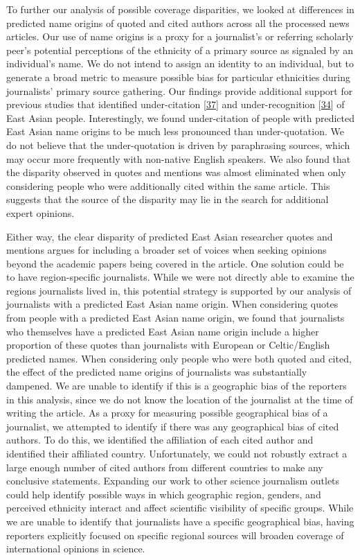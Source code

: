 To further our analysis of possible coverage disparities, we looked at differences in predicted name origins of quoted and cited authors across all the processed news articles.
Our use of name origins is a proxy for a journalist's or referring scholarly peer's potential perceptions of the ethnicity of a primary source as signaled by an individual's name.
We do not intend to assign an identity to an individual, but to generate a broad metric to measure possible bias for particular ethnicities during journalists' primary source gathering.
Our findings provide additional support for previous studies that identified under-citation {[}\protect\hyperlink{ref-MpfuFcH2}{37}{]} and under-recognition {[}\protect\hyperlink{ref-GCXcas65}{34}{]} of East Asian people.
Interestingly, we found under-citation of people with predicted East Asian name origins to be much less pronounced than under-quotation.
We do not believe that the under-quotation is driven by paraphrasing sources, which may occur more frequently with non-native English speakers.
We also found that the disparity observed in quotes and mentions was almost eliminated when only considering people who were additionally cited within the same article.
This suggests that the source of the disparity may lie in the search for additional expert opinions.

Either way, the clear disparity of predicted East Asian researcher quotes and mentions argues for including a broader set of voices when seeking opinions beyond the academic papers being covered in the article.
One solution could be to have region-specific journalists.
While we were not directly able to examine the regions journalists lived in, this potential strategy is supported by our analysis of journalists with a predicted East Asian name origin.
When considering quotes from people with a predicted East Asian name origin, we found that journalists who themselves have a predicted East Asian name origin include a higher proportion of these quotes than journalists with European or Celtic/English predicted names.
When considering only people who were both quoted and cited, the effect of the predicted name origins of journalists was substantially dampened.
We are unable to identify if this is a geographic bias of the reporters in this analysis, since we do not know the location of the journalist at the time of writing the article.
As a proxy for measuring possible geographical bias of a journalist, we attempted to identify if there was any geographical bias of cited authors.
To do this, we identified the affiliation of each cited author and identified their affiliated country.
Unfortunately, we could not robustly extract a large enough number of cited authors from different countries to make any conclusive statements.
Expanding our work to other science journalism outlets could help identify possible ways in which geographic region, genders, and perceived ethnicity interact and affect scientific visibility of specific groups.
While we are unable to identify that journalists have a specific geographical bias, having reporters explicitly focused on specific regional sources will broaden coverage of international opinions in science.

